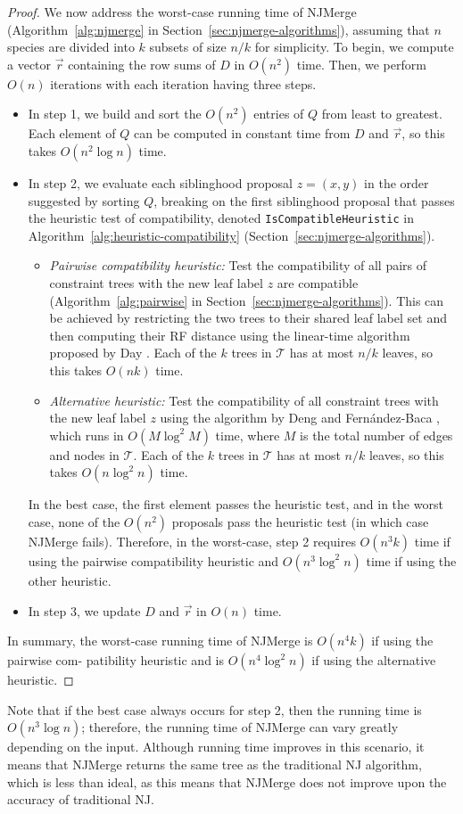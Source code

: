 \begin{proof}
We now address the worst-case running time of NJMerge (Algorithm~\ref{alg:njmerge} in Section~\ref{sec:njmerge-algorithms}), assuming that $n$ species are divided into $k$ subsets of size $n/k$ for simplicity.
To begin, we compute a vector $\vec{r}$ containing the row sums of $D$ in $O(n^2)$ time. Then, we perform $O(n)$ iterations with each iteration having three steps.
\begin{itemize}
	\item In step 1, we build and sort the $O(n^2)$ entries of $Q$ from least to greatest. Each element of $Q$ can be computed in constant time from $D$ and $\vec{r}$, so this takes $O(n^2\log{n})$ time. %
	\item In step 2, we evaluate each siblinghood proposal $z = (x,y)$ in the order suggested by sorting $Q$, breaking on the first siblinghood proposal that passes the heuristic test of compatibility, denoted {\tt IsCompatibleHeuristic} in Algorithm~\ref{alg:heuristic-compatibility} (Section~\ref{sec:njmerge-algorithms}).
	\begin{itemize}
	\item {\em Pairwise compatibility heuristic:} 
	Test the compatibility of all pairs of constraint trees with the new leaf label $z$ are compatible (Algorithm~\ref{alg:pairwise} in Section~\ref{sec:njmerge-algorithms}). 
	This can be achieved by restricting the two trees to their shared leaf label set and then computing their \gls{RF} distance using the linear-time algorithm proposed by Day \cite{day1985optimal}.
	Each of the $k$ trees in $\mathcal{T}$ has at most $n/k$ leaves, so this takes $O(nk)$ time.
	\item {\em Alternative heuristic:} 
	Test the compatibility of all constraint trees with the new leaf label $z$ using the algorithm by Deng and Fern{\'a}ndez-Baca \cite{deng2018fast}, which runs in $O(M \log^2{M})$ time, where $M$ is the total number of edges and nodes in $\mathcal{T}$.
	Each of the $k$ trees in $\mathcal{T}$ has at most $n/k$ leaves, so this takes $O(n \log^2{n})$ time.
	\end{itemize}
	In the best case, the first element passes the heuristic test, and in the worst case, none of the $O(n^2)$ proposals pass the heuristic test (in which case NJMerge fails).
	Therefore, in the worst-case, step 2 requires $O(n^3k)$ time if using the pairwise compatibility heuristic and 
	$O(n^3 \log^2{n})$ time if using the other heuristic.
	\item In step 3, we update $D$ and $\vec{r}$ in $O(n)$ time.
\end{itemize}
In summary, the worst-case running time of NJMerge is $O(n^4k)$ if using the pairwise com-
\clearpage
\noindent patibility heuristic and is $O(n^4 \log^2{n})$ if using the alternative heuristic.
\end{proof}
Note that if the best case always occurs for step 2, then the running time is $O(n^3 \log{n})$; therefore, the running time of NJMerge can vary greatly depending on the input. Although running time improves in this scenario, it means that NJMerge returns the same tree as the traditional NJ algorithm, which is less than ideal, as this means that NJMerge does not improve upon the accuracy of traditional NJ.

